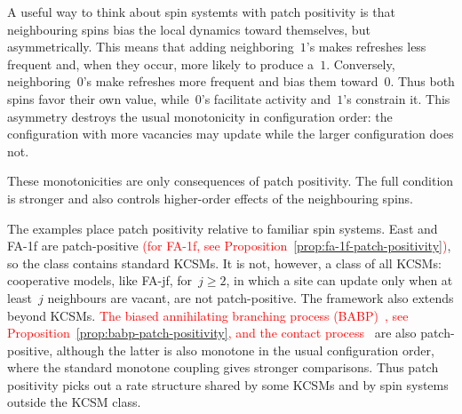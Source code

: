A useful way to think about spin systemts with patch positivity is that neighbouring spins bias
the local dynamics toward themselves, but asymmetrically.  This means that adding
neighboring~$1$'s makes refreshes less frequent and, when they occur, more
likely to produce a~$1$. Conversely, neighboring~$0$'s make refreshes more
frequent and bias them toward~$0$. Thus both spins favor their own value,
while~$0$'s facilitate activity and~$1$'s constrain it. This asymmetry destroys
the usual monotonicity in configuration order: the configuration with more
vacancies may update while the larger configuration does not. 


{\color{Bleu} These
monotonicities are only consequences of patch positivity.}   The full condition is
stronger and also controls higher-order effects of the neighbouring spins. 

%
%

The examples place patch positivity relative to familiar spin systems. East
and FA-1f are patch-positive\textcolor{red}{ (for FA-1f, see
Proposition~\ref{prop:fa-1f-patch-positivity})}, so the class contains standard
KCSMs. It is not,
however, a class of all KCSMs: cooperative models, like FA-jf, for~$j\geq 2$, in which a site can update only when at
least~$j$ neighbours are vacant, are not patch-positive. The framework also
extends beyond KCSMs. \textcolor{red}{The biased annihilating branching
process (BABP)~\cite{NeuhauserSudbury1993}, see
Proposition~\ref{prop:babp-patch-positivity}, and the contact
process~\cite{Harris1974}} are also patch-positive, although the latter is also
monotone in the usual configuration order, where the standard monotone coupling
gives stronger comparisons. Thus patch positivity picks out a rate structure shared by some
KCSMs and by spin systems outside the KCSM class.

